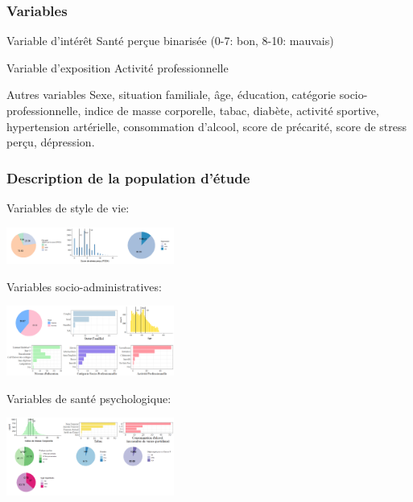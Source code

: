 \documentclass{beamer}
\begin{document}
\begin{frame}
\frametitle{Variables}

\pause
\begin{beamerboxesrounded}[upper = titre, lower = texte, shadow = true]{Variable d'intérêt}
\pause
Santé perçue binarisée (0-7: bon, 8-10: mauvais)
\end{beamerboxesrounded}

\pause
\begin{beamerboxesrounded}[upper = titre, lower = texte, shadow = true]{Variable d'exposition}
\pause
Activité professionnelle
\end{beamerboxesrounded}

\pause
\begin{beamerboxesrounded}[upper = titre, lower = texte, shadow = true]{Autres variables}
\pause
Sexe, situation familiale, âge, éducation, catégorie socio-professionnelle, indice de masse corporelle, tabac, diabète, activité sportive, hypertension artérielle, consommation d'alcool, score de précarité, score de stress perçu, dépression.
\end{beamerboxesrounded}

\end{frame}

\begin{frame}
\frametitle{Description de la population d'étude}

\pause
Variables de style de vie:\\
\pause
\begin{center}
\includegraphics[width = 5.5cm]{tab_var_sante_psy.png}\\
\end{center}

\pause
Variables socio-administratives:\\
\pause
\begin{center}
\includegraphics[width = 5.5cm]{tab_var_socio_ad.png}\\
\end{center}

\pause
Variables de santé psychologique:\\
\pause
\begin{center}
\includegraphics[width = 5.5cm ]{tab_var_sante_phys.png}\\
\end{center}

\end{frame}
\end{document}
